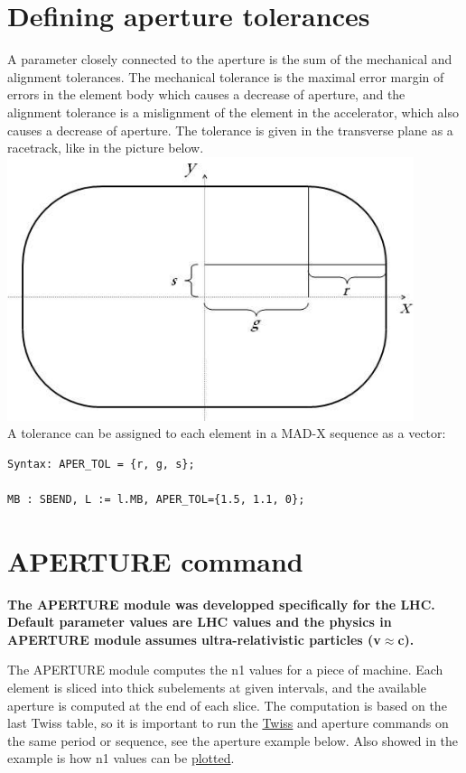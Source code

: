 \section{Defining aperture tolerances}
A parameter closely connected to the aperture is the sum of the
mechanical and alignment tolerances. The mechanical tolerance is the
maximal error margin of errors in the element body which causes a
decrease of aperture, and the alignment tolerance is a mislignment of
the element in the accelerator, which also causes a decrease of
aperture. The tolerance is given in the transverse plane as a racetrack,
like in the picture below. 
\\
\includegraphics[width=450px]{Introduction/tolerance.jpg}
\\ 
A tolerance can be assigned to each element in a MAD-X sequence as a vector: 
\begin{verbatim}
Syntax: APER_TOL = {r, g, s};

MB : SBEND, L := l.MB, APER_TOL={1.5, 1.1, 0};
\end{verbatim}

\section{APERTURE command}
{\bf The APERTURE module was developped specifically for the LHC.\\ 
Default parameter values are LHC values and the physics 
in APERTURE module assumes ultra-relativistic particles (v\(\approx\)c).} 

The APERTURE module computes the n1 values for a piece of machine. 
Each element is sliced into thick subelements at given intervals, and
the available aperture is computed at the end of each slice. 
The computation is based on the last Twiss table, so it is important to
run the 
\href{../twiss/twiss.html}{Twiss} and aperture commands on the same
period or sequence, see the aperture example below. Also showed in the
example is how n1 values can be \href{../plot/plot.html}{plotted}.   

